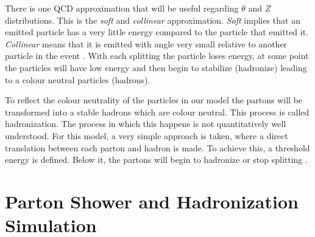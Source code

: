 There is one QCD approximation that will be useful regarding $\theta$ and $Z$ distributions. This is the \textit{soft} and \textit{collinear} approximation. \textit{Soft} implies that an emitted particle has a very little energy compared to the particle that emitted it. \textit{Collinear} means that it is emitted with angle very small relative to another particle in the event \citep{Salam:2010zt}. With each splitting the particle loses energy, at some point the particles will have low energy and then begin to stabilize (hadronize) leading to a colour neutral particles (hadrons).

To reflect the colour neutrality of the particles in our model the partons will be transformed into a stable hadrons which are colour neutral. This process is called hadronization. The process in which this happens is not quantitatively well understood. For this model, a very simple approach is taken, where a direct translation between each parton and hadron is made. To achieve  this, a threshold energy is defined. Below it, the partons will begin to hadronize or stop splitting \citep{Salam:2010zt}. 


\section{Parton Shower and Hadronization Simulation}

